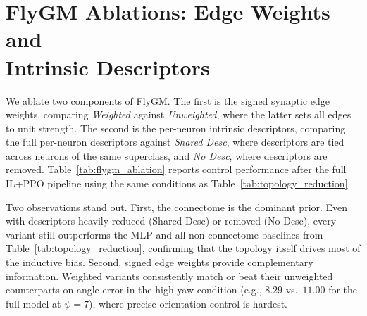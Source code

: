 \documentclass[a4paper]{easychair}
\begin{document}
\section{FlyGM Ablations: Edge Weights and\\ Intrinsic Descriptors}
\label{app:flygm_ablation}

We ablate two components of FlyGM. The first is the signed synaptic edge weights, comparing \emph{Weighted} against \emph{Unweighted}, where the latter sets all edges to unit strength. The second is the per-neuron intrinsic descriptors, comparing the full per-neuron descriptors against \emph{Shared Desc}, where descriptors are tied across neurons of the same superclass, and \emph{No Desc}, where descriptors are removed. Table~\ref{tab:flygm_ablation} reports control performance after the full IL+PPO pipeline using the same conditions as Table~\ref{tab:topology_reduction}.

Two observations stand out. First, the connectome is the dominant prior. Even with descriptors heavily reduced (Shared Desc) or removed (No Desc), every variant still outperforms the MLP and all non-connectome baselines from Table~\ref{tab:topology_reduction}, confirming that the topology itself drives most of the inductive bias. Second, signed edge weights provide complementary information. Weighted variants consistently match or beat their unweighted counterparts on angle error in the high-yaw condition (e.g., $8.29$ vs.\ $11.00$ for the full model at $\psi{=}7$), where precise orientation control is hardest.
\end{document}
